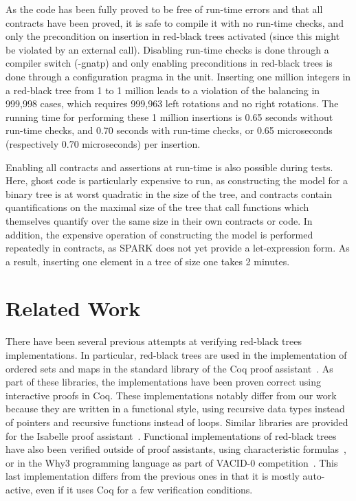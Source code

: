 \documentclass{llncs}
\begin{document}
As the code has been fully proved to be free of run-time errors and that all
contracts have been proved, it is safe to compile it with no run-time checks,
and only the precondition on insertion in red-black trees activated (since this
might be violated by an external call). Disabling run-time checks is done
through a compiler switch (-gnatp) and only enabling preconditions in red-black
trees is done through a configuration pragma in the unit. Inserting one million
integers in a red-black tree from 1 to 1 million leads to a violation of the
balancing in 999,998 cases, which requires 999,963 left rotations and no
right rotations. The running time for
performing these 1 million insertions is 0.65 seconds without run-time checks,
and 0.70 seconds with run-time checks, or 0.65 microseconds (respectively 0.70
microseconds) per insertion.

Enabling all contracts and assertions at run-time is also possible during
tests. Here, ghost code is particularly expensive to run, as constructing the
model for a binary tree is at worst quadratic in the size of the tree, and
contracts contain quantifications on the maximal size of the tree that call
functions which themselves quantify over the same size in their own contracts
or code. In addition, the expensive operation of constructing the model is
performed repeatedly in contracts, as SPARK does not yet provide a
let-expression form.  As a result, inserting one element in a tree of size one
takes 2 minutes.

\section{Related Work}
\label{related-work}
There have been several previous attempts at verifying red-black trees implementations. In particular, red-black trees are
used in the implementation of ordered sets and maps in the standard library of the Coq proof
assistant~\cite{appel2011efficient,filliatre2004functors}. As part of these libraries, the implementations have been proven
correct using interactive proofs in Coq. These implementations notably differ from our work because they are written in
a functional style, using recursive data types instead of pointers and recursive functions instead of loops. Similar
libraries are provided for the Isabelle proof assistant~\cite{lammich2010isabelle}. Functional implementations of
red-black trees have also been verified outside of proof assistants, using characteristic formulas~\cite{chargueraud2010program},
or in the Why3 programming language as part of VACID-0 competition~\cite{leino2010vacid}. This last implementation differs from
the previous ones in that it is mostly auto-active, even if it uses Coq for a few verification conditions.
\end{document}
